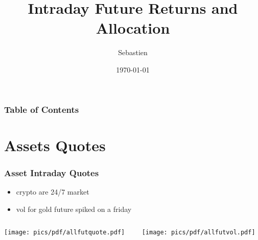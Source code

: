 \documentclass[9pt]{beamer}
\title[Intraday Future Returns]{Intraday Future Returns and Allocation}
\author[SH]{Sebastien}
\date[\today]{\today}
\begin{document}
\begin{frame}
    \titlepage 
\end{frame}
\begin{frame}
    \frametitle{Table of Contents} %
    \tableofcontents %
\end{frame}
\section{Assets Quotes} 
\begin{frame}
	\frametitle{Asset Intraday Quotes}
    \begin{itemize}
        \item crypto are 24/7 market
        \item vol for gold future spiked on a friday
    \end{itemize}
    \begin{columns}
    \begin{column}{.5\textwidth}
	    \texttt{[image: pics/pdf/allfutquote.pdf]}
    \end{column}
    \begin{column}{.5\textwidth}
	    \texttt{[image: pics/pdf/allfutvol.pdf]}
    \end{column}%
    \end{columns}
\end{frame}
\end{document}
